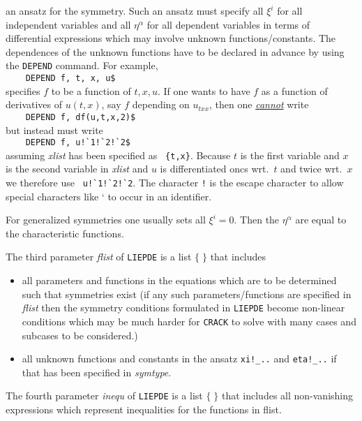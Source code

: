 \begin{description}
  an ansatz for the symmetry. Such an ansatz must specify all $\xi^i$
  for all independent variables and all $\eta^{\alpha}$ for all
  dependent variables in terms of differential expressions which may
  involve unknown functions/constants.  The dependences of the unknown
  functions have to be declared in advance by using the
  \texttt{DEPEND} command. For example, \\  
  \verb+    DEPEND f, t, x, u$+ \\
  specifies $f$ to be a function of $t,x,u$. If one wants to have $f$
  as a function of derivatives of $u(t,x)$, say $f$ depending on
  $u_{txx}$, then one \underline{\textit{cannot}} write \\
  \verb+    DEPEND f, df(u,t,x,2)$+ \\
  but instead must write \\
  \verb+    DEPEND f, u!`1!`2!`2$+ \\
  assuming \textit{xlist} has been specified as \verb+ {t,x}+.
  Because $t$ is the first variable and $x$ is the second variable in
  \textit{xlist} and $u$ is differentiated oncs wrt.\ $t$ and twice
  wrt.\ $x$ we therefore use \verb+ u!`1!`2!`2+. The character
  \texttt{!} is the escape character to allow special characters like
  ` to occur in an identifier.
  
  For generalized symmetries one usually sets all $\xi^i=0$.  Then the
  $\eta^{\alpha}$ are equal to the characteristic functions.
\end{description}
\noindent The third parameter \textit{flist} of \texttt{LIEPDE} is a list $\{\;\}$ 
that includes
\begin{itemize}
\item all parameters and functions in the equations which are to
      be determined such that symmetries exist (if any such 
      parameters/functions are 
      specified in \textit{flist} then the symmetry conditions 
      formulated in \texttt{LIEPDE}
      become non-linear conditions which may be much harder for
      \texttt{CRACK} to solve with many cases and subcases to be considered.)
\item all unknown functions and constants in the ansatz 
      \verb+xi!_..+ and \verb+eta!_..+
      if that has been specified in \textit{symtype}.
\end{itemize}
\noindent The fourth parameter \textit{inequ} of \texttt{LIEPDE} is a list $\{\;\}$ 
that includes all non-vanishing expressions which represent
inequalities for the functions in flist.

